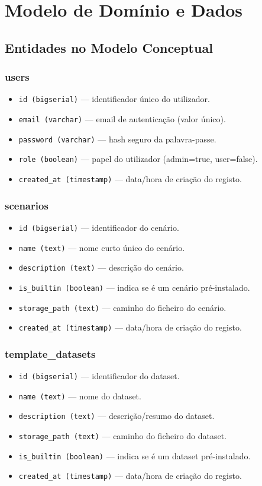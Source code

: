 \section{Modelo de Domínio e Dados}

\subsection{Entidades no Modelo Conceptual}
\subsubsection{users}
\begin{itemize}
  \item \texttt{id (bigserial)} — identificador único do utilizador.
  \item \texttt{email (varchar)} — email de autenticação (valor único).
  \item \texttt{password (varchar)} — hash seguro da palavra-passe.
  \item \texttt{role (boolean)} — papel do utilizador (admin=true, user=false).
  \item \texttt{created\_at (timestamp)} — data/hora de criação do registo.
\end{itemize}

\subsubsection{scenarios}
\begin{itemize}
  \item \texttt{id (bigserial)} — identificador do cenário.
  \item \texttt{name (text)} — nome curto único do cenário.
  \item \texttt{description (text)} — descrição do cenário.
  \item \texttt{is\_builtin (boolean)} — indica se é um cenário pré-instalado.
  \item \texttt{storage\_path (text)} — caminho do ficheiro do cenário.
  \item \texttt{created\_at (timestamp)} — data/hora de criação do registo.
\end{itemize}

\subsubsection{template\_datasets}
\begin{itemize}
  \item \texttt{id (bigserial)} — identificador do dataset.
  \item \texttt{name (text)} — nome do dataset.
  \item \texttt{description (text)} — descrição/resumo do dataset.
  \item \texttt{storage\_path (text)} — caminho do ficheiro do dataset.
  \item \texttt{is\_builtin (boolean)} — indica se é um dataset pré-instalado.
  \item \texttt{created\_at (timestamp)} — data/hora de criação do registo.
\end{itemize}

